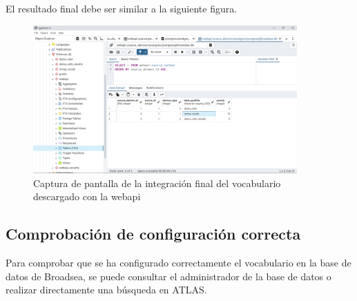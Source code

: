 \begin{enumerate}
    El resultado final debe ser similar a la siguiente figura.

    \begin{figure}[H]
        \centering
        \includegraphics[width=0.90\textwidth]{figures/omopVocabResult.png}
        \caption{Captura de pantalla de la integración final del vocabulario descargado con la webapi}
        \label{fig:omopVocabResult}
    \end{figure}

\end{enumerate}

\subsection{Comprobación de configuración correcta} \label{subsec:05comprobacion}

Para comprobar que se ha configurado correctamente el vocabulario en la base de datos de Broadsea, se puede consultar el administrador de la base de datos o realizar directamente una búsqueda en ATLAS.

